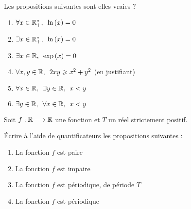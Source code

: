 \begin{exo}
Les propositions suivantes sont-elles vraies ?

\begin{enumerate}
\item \(\quantifs{\forall x\in\Rps}\ln\paren{x}=0\) \\

\item \(\quantifs{\exists x\in\Rps}\ln\paren{x}=0\) \\

\item \(\quantifs{\exists x\in\R}\exp\paren{x}=0\) \\

\item \(\quantifs{\forall x,y\in\R}2xy\geq x^2+y^2\) (en justifiant) \\

\item \(\quantifs{\forall x\in\R;\exists y\in\R}x<y\) \\

\item \(\quantifs{\exists y\in\R;\forall x\in\R}x<y\)
\end{enumerate}
\end{exo}

\begin{corr}
\end{corr}

\begin{exo}
Soit \(f:\mathbb{R}\longrightarrow\mathbb{R}\) une fonction et \(T\) un réel strictement positif.

Écrire à l'aide de quantificateurs les propositions suivantes :

\begin{enumerate}
\item La fonction \(f\) est paire \\

\item La fonction \(f\) est impaire \\

\item La fonction \(f\) est périodique, de période \(T\) \\

\item La fonction \(f\) est périodique
\end{enumerate}
\end{exo}

\begin{corr}
\end{corr}

